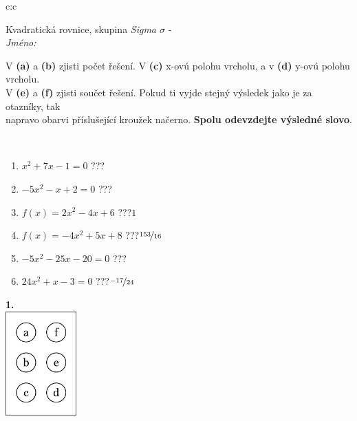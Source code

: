 \documentclass[10pt]{report}
\begin{document}
\begin{tabular}{c:c}
\begin{minipage}[c][104.5mm][t]{0.5\linewidth}
\begin{center}
\vspace{7mm}
{\huge Kvadratická rovnice, skupina \textit{Sigma $\sigma$} -}\\[5mm]
\textit{Jméno:}\phantom{xxxxxxxxxxxxxxxxxxxxxxxxxxxxxxxxxxxxxxxxxxxxxxxxxxxxxxxxxxxxxxxxx}\\[5mm]
\begin{minipage}{0.95\linewidth}
\begin{center}
V \textbf{(a)} a \textbf{(b)} zjisti počet řešení. V \textbf{(c)} x-ovú polohu vrcholu, a v \textbf{(d)} y-ovú polohu vrcholu.\\V \textbf{(e)} a \textbf{(f)} zjisti součet řešení. Pokud ti vyjde stejný výsledek jako je za otazníky, tak\\napravo obarvi příslušející kroužek načerno. \textbf{Spolu odevzdejte výsledné slovo}.
\end{center}
\end{minipage}
\\[1mm]
\begin{minipage}{0.79\linewidth}
\begin{center}
\begin{varwidth}{\linewidth}
\begin{enumerate}
\Large
\item $x^2+7x-1=0$\quad \dotfill\; ???\;\dotfill {}
\item $-5x^2-x+2=0$\quad \dotfill\; ???\;\dotfill {}
\item $f(x)=2x^2-4x+6$\quad \dotfill\; ???\;\dotfill \quad $1$
\item $f(x)=-4x^2+5x+8$\quad \dotfill\; ???\;\dotfill \quad $\nicefrac{153}{16}$
\item $-5x^2-25x-20=0$\quad \dotfill\; ???\;\dotfill {}
\item $24x^2+x-3=0$\quad \dotfill\; ???\;\dotfill \quad $\nicefrac{-17}{24}$
\end{enumerate}
\end{varwidth}
\end{center}
\end{minipage}
\begin{minipage}{0.20\linewidth}
\begin{center}
{\Huge\bfseries 1.} \\[2mm]
\includegraphics[height=40mm]{../images/braille.png}

\end{center}
\end{minipage}
\end{center}
\end{minipage}
\end{tabular}
\end{document}
